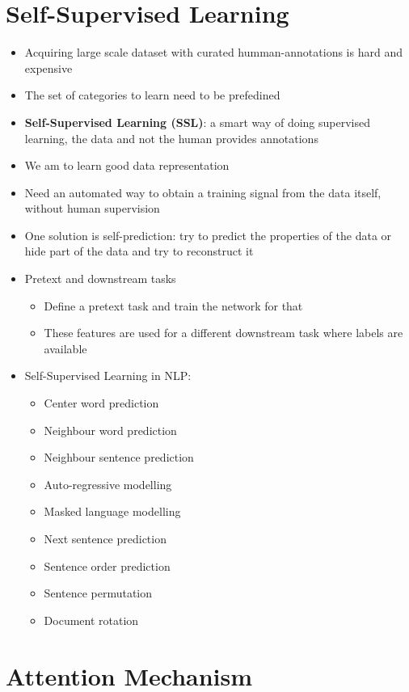 \chapter{Self-Supervised Learning}
\begin{itemize}
    \item Acquiring large scale dataset with curated humman-annotations is hard and expensive
    \item The set of categories to learn need to be prefedined
    \item \textbf{Self-Supervised Learning (SSL)}: a smart way of doing supervised learning, the data and not the human provides annotations
    \item We am to learn good data representation
    \item Need an automated way to obtain a training signal from the data itself, without human supervision
    \item One solution is self-prediction: try to predict the properties of the data or hide part of the data and try to reconstruct it
    \item Pretext and downstream tasks
    \begin{itemize}
        \item Define a pretext task and train the network for that
        \item These features are used for a different downstream task where labels are available
    \end{itemize}
    \item Self-Supervised Learning in NLP:
    \begin{itemize}
        \item Center word prediction
        \item Neighbour word prediction
        \item Neighbour sentence prediction
        \item Auto-regressive modelling
        \item Masked language modelling
        \item Next sentence prediction
        \item Sentence order prediction
        \item Sentence permutation
        \item Document rotation
    \end{itemize}
\end{itemize}


\chapter{Attention Mechanism}
